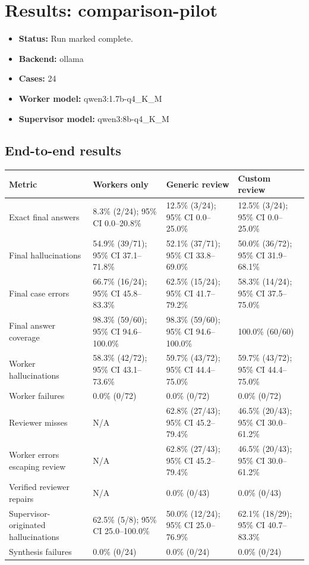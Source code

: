 \documentclass{article}
\begin{document}
\section*{Results: comparison-pilot}
\begin{itemize}
\item \textbf{Status:} Run marked complete.
\item \textbf{Backend:} ollama
\item \textbf{Cases:} 24
\item \textbf{Worker model:} qwen3:1.7b-q4\_K\_M
\item \textbf{Supervisor model:} qwen3:8b-q4\_K\_M
\end{itemize}
\subsection*{End-to-end results}
\begin{center}
\small
\begin{tabularx}{\linewidth}{lXXX}
\toprule
Metric & Workers only & Generic review & Custom review \\
\midrule
Exact final answers & 8.3\% (2/24); 95\% CI 0.0--20.8\% & 12.5\% (3/24); 95\% CI 0.0--25.0\% & 12.5\% (3/24); 95\% CI 0.0--25.0\% \\
Final hallucinations & 54.9\% (39/71); 95\% CI 37.1--71.8\% & 52.1\% (37/71); 95\% CI 33.8--69.0\% & 50.0\% (36/72); 95\% CI 31.9--68.1\% \\
Final case errors & 66.7\% (16/24); 95\% CI 45.8--83.3\% & 62.5\% (15/24); 95\% CI 41.7--79.2\% & 58.3\% (14/24); 95\% CI 37.5--75.0\% \\
Final answer coverage & 98.3\% (59/60); 95\% CI 94.6--100.0\% & 98.3\% (59/60); 95\% CI 94.6--100.0\% & 100.0\% (60/60) \\
Worker hallucinations & 58.3\% (42/72); 95\% CI 43.1--73.6\% & 59.7\% (43/72); 95\% CI 44.4--75.0\% & 59.7\% (43/72); 95\% CI 44.4--75.0\% \\
Worker failures & 0.0\% (0/72) & 0.0\% (0/72) & 0.0\% (0/72) \\
Reviewer misses & N/A & 62.8\% (27/43); 95\% CI 45.2--79.4\% & 46.5\% (20/43); 95\% CI 30.0--61.2\% \\
Worker errors escaping review & N/A & 62.8\% (27/43); 95\% CI 45.2--79.4\% & 46.5\% (20/43); 95\% CI 30.0--61.2\% \\
Verified reviewer repairs & N/A & 0.0\% (0/43) & 0.0\% (0/43) \\
Supervisor-originated hallucinations & 62.5\% (5/8); 95\% CI 25.0--100.0\% & 50.0\% (12/24); 95\% CI 25.0--76.9\% & 62.1\% (18/29); 95\% CI 40.7--83.3\% \\
Synthesis failures & 0.0\% (0/24) & 0.0\% (0/24) & 0.0\% (0/24) \\
\bottomrule
\end{tabularx}
\end{center}
\end{document}
